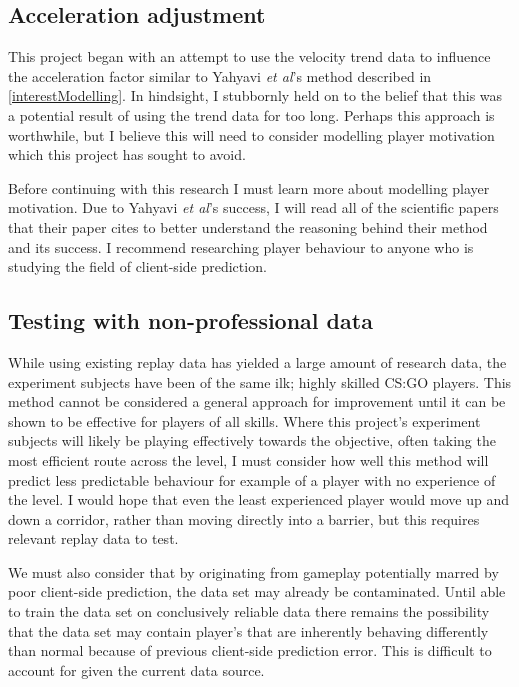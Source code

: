\documentclass[journal]{IEEEtran}
\begin{document}
\subsection{Acceleration adjustment}

This project began with an attempt to use the velocity trend data to influence the acceleration factor similar to Yahyavi \textit{et al}'s method described in \ref{interestModelling}. In hindsight, I stubbornly held on to the belief that this was a potential result of using the trend data for too long. Perhaps this approach is worthwhile, but I believe this will need to consider modelling player motivation which this project has sought to avoid.

Before continuing with this research I must learn more about modelling player motivation. Due to Yahyavi \textit{et al}'s success, I will read all of the scientific papers that their paper cites to better understand the reasoning behind their method and its success. I recommend researching player behaviour to anyone who is studying the field of client-side prediction.

\subsection{Testing with non-professional data}

While using existing replay data has yielded a large amount of research data, the experiment subjects have been of the same ilk; highly skilled CS:GO players. This method cannot be considered a general approach for improvement until it can be shown to be effective for players of all skills. Where this project's experiment subjects will likely be playing effectively towards the objective, often taking the most efficient route across the level, I must consider how well this method will predict less predictable behaviour for example of a player with no experience of the level. I would hope that even the least experienced player would move up and down a corridor, rather than moving directly into a barrier, but this requires relevant replay data to test.

We must also consider that by originating from gameplay potentially marred by poor client-side prediction, the data set may already be contaminated. Until able to train the data set on conclusively reliable data there remains the possibility that the data set may contain player's that are inherently behaving differently than normal because of previous client-side prediction error. This is difficult to account for given the current data source.
\end{document}
